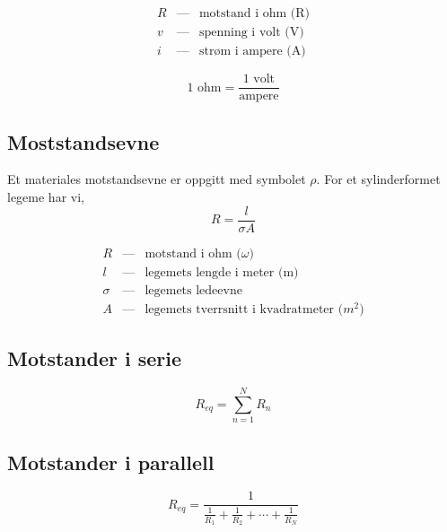 \documentclass[norsk, a4paper, 12pt, twoside, titlepage]{article}
\begin{document}
\begin{eqnarray*}
R & \mbox{---} & \mbox{motstand i ohm (R)} \\
v & \mbox{---} & \mbox{spenning i volt (V)} \\
i & \mbox{---} & \mbox{strøm i ampere (A)}
\end{eqnarray*}

\bigskip

\begin{equation}
1 \mbox{ ohm} = \frac{\mbox{1 volt}}{\mbox{ampere}}
\end{equation}

\subsection{Moststandsevne}
Et materiales motstandsevne er oppgitt med symbolet $\rho$.
For et sylinderformet legeme har vi,
\begin{equation}
R = \frac{l}{\sigma A}
\end{equation}

\begin{eqnarray*}
R & \mbox{---} & \mbox{motstand i ohm ($\omega$)} \\
l & \mbox{---} & \mbox{legemets lengde i meter (m)} \\
\sigma & \mbox{---} & \mbox{legemets ledeevne} \\
A & \mbox{---} & \mbox{legemets tverrsnitt i kvadratmeter ($m^{2}$)}
\end{eqnarray*}

\subsection{Motstander i serie}
\begin{equation}
R_{eq} = \sum_{n=1}^{N}R_{n}
\end{equation}

\subsection{Motstander i parallell}
\begin{equation}
R_{eq} = \frac{1}{\frac{1}{R_{1}} + \frac{1}{R_{2}} + \cdots + \frac{1}{R_{N}}}
\end{equation}
\end{document}
